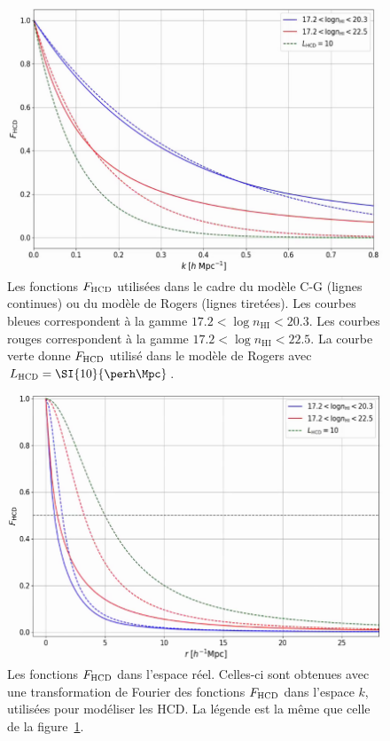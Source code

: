 \begin{figure}
  \centering
  \includegraphics[scale=0.4]{f_hcd_range}
  \caption{Les fonctions $F_{\textsc{HCD}}$ utilisées dans le cadre du modèle C-G (lignes continues) ou du modèle de Rogers (lignes tiretées).
    Les courbes bleues correspondent à la gamme $\num{17.2} < \log n_{\mathrm{HI}} < \num{20.3}$. Les courbes rouges correspondent à la gamme $\num{17.2} < \log n_{\mathrm{HI}} < \num{22.5}$. La courbe verte donne $F_{\textsc{HCD}}$ utilisé dans le modèle de Rogers avec $L_{\textsc{HCD}} = \SI{10}{\perh\Mpc}$.
}
  \label{fig:f_hcd_range}
\end{figure}

\begin{figure}
  \centering
  \includegraphics[scale=0.4]{f_hcd_range_real}
  \caption{Les fonctions $F_{\textsc{HCD}}$ dans l'espace réel. Celles-ci sont obtenues avec une transformation de Fourier des fonctions $F_{\textsc{HCD}}$ dans l'espace $k$, utilisées pour modéliser les HCD.
    La légende est la même que celle de la figure~\ref{fig:f_hcd_range}.
}
  \label{fig:f_hcd_range_real}
\end{figure}


